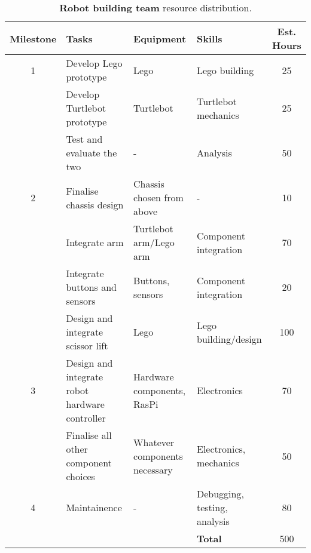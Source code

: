 \documentclass{article}
\begin{document}
\begin{table*}[]
  \begin{center}
  \begin{small}
  \begin{tabular}{|c|l|l|l|c|}
    \hline
    {\bf Milestone} & {\bf Tasks} & {\bf Equipment} & {\bf Skills} & {\bf Est. Hours} \\ \hline
    1               & Develop Lego prototype & Lego & Lego building & 25\\ \cline{2-5}
                    & Develop Turtlebot prototype & Turtlebot & Turtlebot mechanics & 25\\ \cline{2-5}
                    & Test and evaluate the two & - & Analysis & 50\\ \hline
    2               & Finalise chassis design & Chassis chosen from above & - & 10\\ \cline{2-5}
                    & Integrate arm & Turtlebot arm/Lego arm & Component integration & 70\\ \cline{2-5}
                    & Integrate buttons and sensors & Buttons, sensors & Component integration & 20\\ \cline{2-5}
                    & Design and integrate scissor lift & Lego & Lego building/design & 100\\ \hline
    3               & Design and integrate robot hardware controller & Hardware components, RasPi & Electronics & 70\\ \cline{2-5}
                    & Finalise all other component choices & Whatever components necessary & Electronics, mechanics & 50\\ \hline
    4               & Maintainence & - & Debugging, testing, analysis & 80\\ \hline
                    &                           &  & {\bf Total} & 500 \\ \hline
  \end{tabular}
  \end{small}
  \caption{{\bf Robot building team} resource distribution.}
  \label{tab:rb-rd}
  \end{center}
\end{table*}
\end{document}
